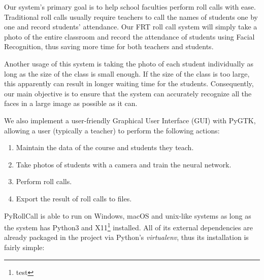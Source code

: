 Our system's primary goal is to help school faculties perform roll calls with ease.
Traditional roll calls usually require teachers to call the names of students one by one
and record students' attendance. Our FRT roll call system will simply take a photo
of the entire classroom and record the attendance of students using Facial Recognition,
thus saving more time for both teachers and students.
\vspace{0.5cm}

Another usage of this system is taking the photo of each student individually as long as
the size of the class is small enough. If the size of the class is too large, this apparently
can result in longer waiting time for the students. Consequently, our main objective is
to ensure that the system can accurately recognize all the faces in a large image
as possible as it can.
\vspace{0.5cm}

We also implement a user-friendly Graphical User Interface (GUI) with PyGTK,
allowing a user (typically a teacher) to perform the following actions:
\vspace{0.5cm}

\begin{enumerate}
  \item Maintain the data of the course and students they teach.
  \item Take photos of students with a camera and train the neural network.
  \item Perform roll calls.
  \item Export the result of roll calls to files.
\end{enumerate}
\setstretch{\myContentLineSpacing}

PyRollCall is able to run on Windows, macOS and unix-like systems as long as
the system has Python3 and X11\footnote{test} installed. All of its external dependencies are already packaged
in the project via Python's \emph{virtualenv}, thus its installation is fairly simple:
\vspace{0.5cm}

